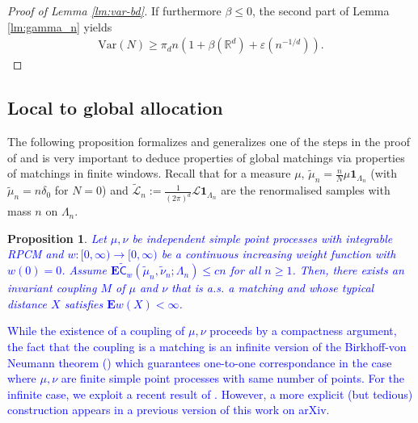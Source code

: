 \documentclass[12pt]{article}
\newtheorem{proposition}[theorem]{Proposition}
\newcommand{\C}{ {\mathsf C}}
\newcommand{\Leb}{\mathcal{L}}
\newcommand{\tLeb}{\tilde{\mathcal{L}}}
\newcommand{\1}{\mathbf{1}}
\newcommand{\tmu}{\tilde{\mu}}
\newcommand{\E}{\mathbf  E}
\newcommand{\var}{\text{Var}}
\newcommand{\obsolete}[1]{\textcolor{gray}{{#1}}}
\newcommand{\RL}[1]{\textcolor{blue}{#1}}
\newcommand{\dy}[1]{\textcolor{blue}{#1}}
\newcommand{\obsolete}[1]{}%
\newcommand{\RL}[1]{#1}%
\newcommand{\dy}[1]{#1}%
\begin{document}
{{{{{\begin{proof}[Proof of Lemma  \ref{lm:var-bd}]
If furthermore $ \beta \leqslant 0$, the second part of Lemma \ref{lm:gamma_n} yields
%
\begin{align*}
\var(N)\geqslant \pi_d n(1+\beta (\mathbb{R}^{d})+\varepsilon (n^{-1/d})).
\end{align*}
%
\end{proof}
%
  \subsection{Local to global allocation}
 \label{sec:global}
%

The following proposition formalizes and generalizes one of the steps in the proof of \cite[Theorem 1(iii)]{holroyd2009poisson} and is very important to deduce properties of global matchings via properties of matchings in finite windows.
Recall that for a measure $\mu$, $ \tilde  \mu _{n}= \frac{n}{N} \mu\1_{\Lambda _{n}}$ (with $\tmu_n = n\delta_0$ for $N=0$) and $\tLeb_n := \frac{1}{(2\pi)^d} \Leb \1_{\Lambda _{n}}$ {are} the renormalised samples with mass $n$ on $ \Lambda _{n}.$
%

%
\begin{proposition}
\label{p:matching_limit}
 \RL{Let $ \mu ,\nu $ be independent {simple point processes} with integrable RPCM and $w : [0,\infty) \to [0,\infty)$ be a {continuous increasing} weight function with $ w(0) = 0$.
%
Assume $\E\widetilde {\C}_{w}(\tmu _{n}, \tilde \nu _{n};\Lambda_n) \leqslant cn$   for all $n \geqslant  1$. Then, there exists  an invariant coupling $M$ of $\mu$  and $\nu$ {that is a.s. a matching and} whose typical distance $ X$ satisfies $ \mathbf{E}w(X)<\infty$.}
%
\end{proposition}
%
\dy{ While the existence of a coupling of $\mu,\nu$ proceeds by a compactness argument, the fact that the coupling is a matching is an infinite version of the Birkhoff-von Neumann theorem (\cite[Exercise 40]{santambrogio2015optimal}) which guarantees one-to-one correspondance in the case where $\mu,\nu$ are finite simple point processes with same number of points. For \RL{the infinite case}, we exploit a recent result of  \cite{erbar2023optimal}. However, a more explicit (but tedious) construction appears in a previous version of this work on arXiv.}


}}}}}
\end{document}
